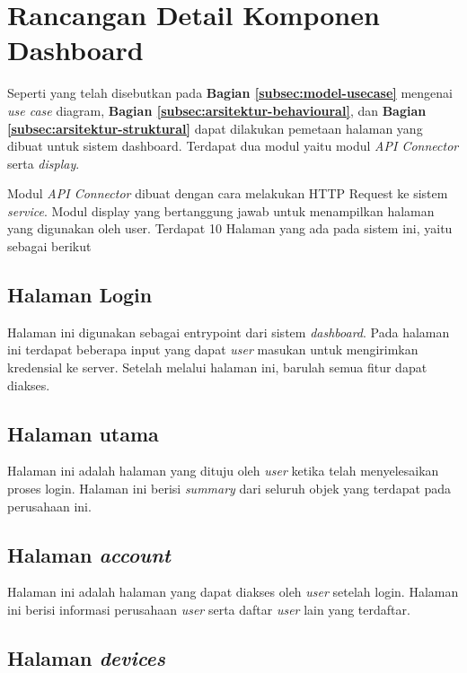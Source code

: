 \section{Rancangan Detail Komponen Dashboard}

Seperti yang telah disebutkan pada \textbf{Bagian \ref{subsec:model-usecase}} mengenai \textit{use case} diagram, \textbf{Bagian \ref{subsec:arsitektur-behavioural}}, dan \textbf{Bagian \ref{subsec:arsitektur-struktural}} dapat dilakukan pemetaan halaman yang dibuat untuk sistem dashboard. Terdapat dua modul yaitu modul \textit{API Connector} serta \textit{display}.

Modul \textit{API Connector} dibuat dengan cara melakukan HTTP Request ke sistem \textit{service}. Modul display yang bertanggung jawab untuk menampilkan halaman yang digunakan oleh user. Terdapat 10 Halaman yang ada pada sistem ini, yaitu sebagai berikut

\subsection{Halaman Login}

Halaman ini digunakan sebagai entrypoint dari sistem \textit{dashboard}. Pada halaman ini terdapat beberapa input yang dapat \textit{user} masukan untuk mengirimkan kredensial ke server. Setelah melalui halaman ini, barulah semua fitur dapat diakses.

\subsection{Halaman utama}

Halaman ini adalah halaman yang dituju oleh \textit{user} ketika telah menyelesaikan proses login. Halaman ini berisi \textit{summary} dari seluruh objek yang terdapat pada perusahaan ini.

\subsection{Halaman \textit{account}}

Halaman ini adalah halaman yang dapat diakses oleh \textit{user} setelah login. Halaman ini berisi informasi perusahaan \textit{user} serta daftar \textit{user} lain yang terdaftar.

\subsection{Halaman \textit{devices}}

